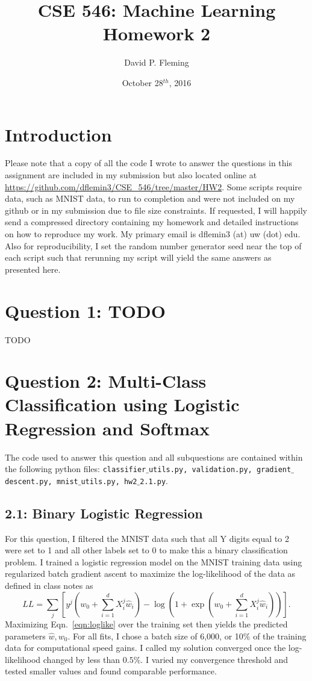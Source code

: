 \documentclass[12pt]{amsart}
\title{CSE 546: Machine Learning Homework 2}
\author{David P. Fleming}
\date{October 28$^{th}$, 2016}
\begin{document}
\maketitle
\tableofcontents

\section*{Introduction}

Please note that a copy of all the code I wrote to answer the questions in this assignment are included in my submission but also located online at \url{https://github.com/dflemin3/CSE_546/tree/master/HW2}.  Some scripts require data, such as MNIST data, to run to completion and were not included on my github or in my submission due to file size constraints.  If requested, I will happily send a compressed directory containing my homework and detailed instructions on how to reproduce my work.  My primary email is dflemin3 (at) uw (dot) edu.  Also for reproducibility, I set the random number generator seed near the top of each script such that rerunning my script will yield the same answers as presented here.


\section*{Question 1: TODO}
TODO

\section*{Question 2: Multi-Class Classification using Logistic Regression and Softmax}

The code used to answer this question and all subquestions are contained within the following python files: {\tt classifier$\_$utils.py, validation.py, gradient$\_$descent.py, mnist$\_$utils.py, hw2$\_$2.1.py}.

\subsection*{2.1: Binary Logistic Regression}

For this question, I filtered the MNIST data such that all Y digits equal to 2 were set to 1 and all other labels set to 0 to make this a binary classification problem.  I trained a logistic regression model on the MNIST training data using regularized batch gradient ascent to maximize the log-likelihood of the data as defined in class notes as
\begin{equation} \label{eqn:loglike}
LL = \sum_j [y^j (w_0 + \sum_{i=1}^d X_i^j \hat{w}_i) - \log(1+ \exp(w_0 + \sum_{i=1}^d X_i^j \hat{w}_i))].
\end{equation}
Maximizing Eqn.~\ref{eqn:loglike} over the training set then yields the predicted parameters $\hat{w}, w_0$.  For all fits, I chose a batch size of 6,000, or 10$\%$ of the training data for computational speed gains.  I called my solution converged once the log-likelihood changed by less than $0.5 \%$.  I varied my convergence threshold and tested smaller values and found comparable performance.
\end{document}
